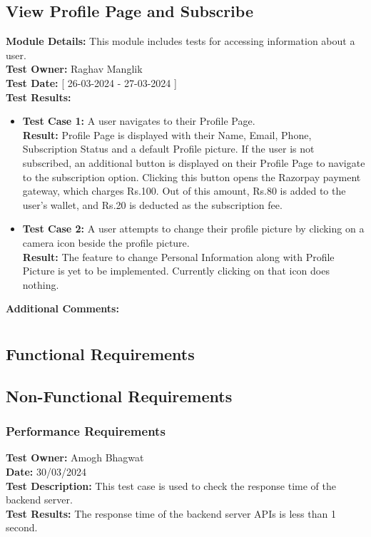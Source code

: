 \documentclass[11pt]{article}
\begin{document}
\subsection{View Profile Page and Subscribe}
\textbf{Module Details: }This module includes tests for accessing information about a user.
\\
\textbf{Test Owner: }Raghav Manglik
\\
\textbf{Test Date: }[ 26-03-2024 - 27-03-2024 ]
\\
\textbf{Test Results: }
\begin{itemize}
    \item \textbf{Test Case 1: }A user navigates to their Profile Page.
    \\
    \textbf{Result: }Profile Page is displayed with their Name, Email, Phone, Subscription Status and a default Profile picture. If the user is not subscribed, an additional button is displayed on their Profile Page to navigate to the subscription option. Clicking this button opens the Razorpay payment gateway, which charges Rs.100. Out of this amount, Rs.80 is added to the user's wallet, and Rs.20 is deducted as the subscription fee.
    \item \textbf{Test Case 2: }A user attempts to change their profile picture by clicking on a camera icon beside the profile picture.
    \\
    \textbf{Result: }The feature to change Personal Information along with Profile Picture is yet to be implemented. Currently clicking on that icon does nothing.
\end{itemize}
\textbf{Additional Comments: }

\newpage
\section{}
\subsection{Functional Requirements}
\subsection{Non-Functional Requirements}
\subsubsection{Performance Requirements}
\textbf{Test Owner: }Amogh Bhagwat\\
\textbf{Date: }30/03/2024\\
\textbf{Test Description: }This test case is used to check the response time of the backend server.\\
\textbf{Test Results: }The response time of the backend server APIs is less than 1 second.\\
\end{document}
